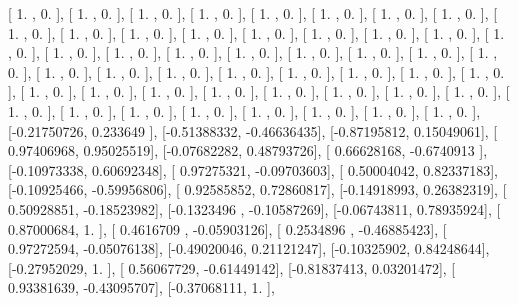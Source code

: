 \documentclass{article}
\begin{document}
       [ 1.        ,  0.        ],
       [ 1.        ,  0.        ],
       [ 1.        ,  0.        ],
       [ 1.        ,  0.        ],
       [ 1.        ,  0.        ],
       [ 1.        ,  0.        ],
       [ 1.        ,  0.        ],
       [ 1.        ,  0.        ],
       [ 1.        ,  0.        ],
       [ 1.        ,  0.        ],
       [ 1.        ,  0.        ],
       [ 1.        ,  0.        ],
       [ 1.        ,  0.        ],
       [ 1.        ,  0.        ],
       [ 1.        ,  0.        ],
       [ 1.        ,  0.        ],
       [ 1.        ,  0.        ],
       [ 1.        ,  0.        ],
       [ 1.        ,  0.        ],
       [ 1.        ,  0.        ],
       [ 1.        ,  0.        ],
       [ 1.        ,  0.        ],
       [ 1.        ,  0.        ],
       [ 1.        ,  0.        ],
       [ 1.        ,  0.        ],
       [ 1.        ,  0.        ],
       [ 1.        ,  0.        ],
       [ 1.        ,  0.        ],
       [ 1.        ,  0.        ],
       [ 1.        ,  0.        ],
       [ 1.        ,  0.        ],
       [ 1.        ,  0.        ],
       [ 1.        ,  0.        ],
       [ 1.        ,  0.        ],
       [ 1.        ,  0.        ],
       [ 1.        ,  0.        ],
       [ 1.        ,  0.        ],
       [ 1.        ,  0.        ],
       [ 1.        ,  0.        ],
       [ 1.        ,  0.        ],
       [ 1.        ,  0.        ],
       [ 1.        ,  0.        ],
       [ 1.        ,  0.        ],
       [ 1.        ,  0.        ],
       [ 1.        ,  0.        ],
       [ 1.        ,  0.        ],
       [ 1.        ,  0.        ],
       [ 1.        ,  0.        ],
       [ 1.        ,  0.        ],
       [-0.21750726,  0.233649  ],
       [-0.51388332, -0.46636435],
       [-0.87195812,  0.15049061],
       [ 0.97406968,  0.95025519],
       [-0.07682282,  0.48793726],
       [ 0.66628168, -0.6740913 ],
       [-0.10973338,  0.60692348],
       [ 0.97275321, -0.09703603],
       [ 0.50004042,  0.82337183],
       [-0.10925466, -0.59956806],
       [ 0.92585852,  0.72860817],
       [-0.14918993,  0.26382319],
       [ 0.50928851, -0.18523982],
       [-0.1323496 , -0.10587269],
       [-0.06743811,  0.78935924],
       [ 0.87000684,  1.        ],
       [ 0.4616709 , -0.05903126],
       [ 0.2534896 , -0.46885423],
       [ 0.97272594, -0.05076138],
       [-0.49020046,  0.21121247],
       [-0.10325902,  0.84248644],
       [-0.27952029,  1.        ],
       [ 0.56067729, -0.61449142],
       [-0.81837413,  0.03201472],
       [ 0.93381639, -0.43095707],
       [-0.37068111,  1.        ],
\end{document}
